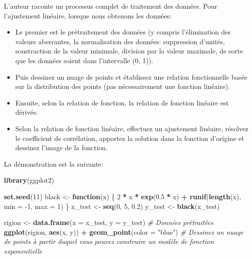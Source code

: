 \documentclass[
]{article}
\newenvironment{Shaded}{\begin{snugshade}}{\end{snugshade}}
\newcommand{\CommentTok}[1]{\textcolor[rgb]{0.56,0.35,0.01}{\textit{#1}}}
\newcommand{\ControlFlowTok}[1]{\textcolor[rgb]{0.13,0.29,0.53}{\textbf{#1}}}
\newcommand{\DataTypeTok}[1]{\textcolor[rgb]{0.13,0.29,0.53}{#1}}
\newcommand{\DecValTok}[1]{\textcolor[rgb]{0.00,0.00,0.81}{#1}}
\newcommand{\FloatTok}[1]{\textcolor[rgb]{0.00,0.00,0.81}{#1}}
\newcommand{\KeywordTok}[1]{\textcolor[rgb]{0.13,0.29,0.53}{\textbf{#1}}}
\newcommand{\NormalTok}[1]{#1}
\newcommand{\OperatorTok}[1]{\textcolor[rgb]{0.81,0.36,0.00}{\textbf{#1}}}
\newcommand{\StringTok}[1]{\textcolor[rgb]{0.31,0.60,0.02}{#1}}
\begin{document}
L'auteur raconte un processus complet de traitement des données. Pour
l'ajustement linéaire, lorsque nous obtenons les données:

\begin{itemize}
\item
  Le premier est le prétraitement des données (y compris l'élimination
  des valeurs aberrantes, la normalisation des données: suppression
  d'unités, soustraction de la valeur minimale, division par la valeur
  maximale, de sorte que les données soient dans l'intervalle (0, 1)).
\item
  Puis dessinez un nuage de points et établissez une relation
  fonctionnelle basée sur la distribution des points (pas nécessairement
  une fonction linéaire).
\item
  Ensuite, selon la relation de fonction, la relation de fonction
  linéaire est dérivée.
\item
  Selon la relation de fonction linéaire, effectuez un ajustement
  linéaire, résolvez le coefficient de corrélation, apportez la solution
  dans la fonction d'origine et dessinez l'image de la fonction.
\end{itemize}

La démonstration est la suivante:

\begin{Shaded}
\begin{Highlighting}[]
\KeywordTok{library}\NormalTok{(ggplot2)}

\KeywordTok{set.seed}\NormalTok{(}\DecValTok{11}\NormalTok{)}
\NormalTok{black <-}\StringTok{ }\ControlFlowTok{function}\NormalTok{(x) \{}
    \DecValTok{2} \OperatorTok{*}\StringTok{ }\NormalTok{x }\OperatorTok{*}\StringTok{ }\KeywordTok{exp}\NormalTok{(}\FloatTok{0.5} \OperatorTok{*}\StringTok{ }\NormalTok{x) }\OperatorTok{+}\StringTok{ }\KeywordTok{runif}\NormalTok{(}\KeywordTok{length}\NormalTok{(x), }\DataTypeTok{min =} \DecValTok{-1}\NormalTok{, }\DataTypeTok{max =} \DecValTok{1}\NormalTok{)}
\NormalTok{\}}
\NormalTok{x_test <-}\StringTok{ }\KeywordTok{seq}\NormalTok{(}\DecValTok{0}\NormalTok{, }\DecValTok{5}\NormalTok{, }\FloatTok{0.2}\NormalTok{)}
\NormalTok{y_test <-}\StringTok{ }\KeywordTok{black}\NormalTok{(x_test)}
 
\NormalTok{rigion <-}\StringTok{ }\KeywordTok{data.frame}\NormalTok{(}\DataTypeTok{x =}\NormalTok{ x_test, }\DataTypeTok{y =}\NormalTok{ y_test)  }\CommentTok{# Données prétraitées}
\KeywordTok{ggplot}\NormalTok{(rigion, }\KeywordTok{aes}\NormalTok{(x, y)) }\OperatorTok{+}\StringTok{ }\KeywordTok{geom_point}\NormalTok{(}\DataTypeTok{color =} \StringTok{"blue"}\NormalTok{)  }\CommentTok{# Dessinez un nuage de points à partir duquel vous pouvez construire un modèle de fonction exponentielle}
\end{Highlighting}
\end{Shaded}
\end{document}
